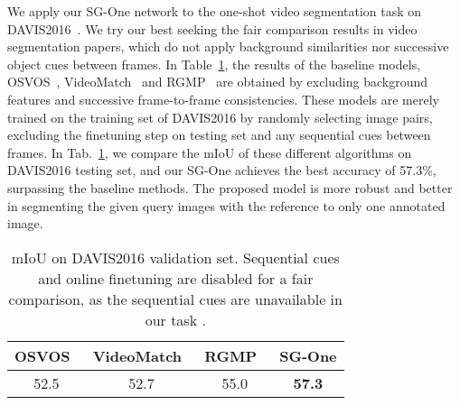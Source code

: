 \documentclass[journal]{IEEEtran}
\begin{document}
We apply our SG-One network to the one-shot video segmentation task on DAVIS2016~\cite{davis2016}.
We try our best seeking the fair comparison results in video segmentation papers, which do not apply background similarities nor successive object cues between frames.
In Table~\ref{davis_comp}, the results of the baseline models, OSVOS~\cite{caelles2017one}, VideoMatch~\cite{hu2018videomatch} and RGMP~\cite{oh2018fast} are obtained by excluding background features and successive frame-to-frame consistencies.
These models are merely trained on the training set of DAVIS2016 by randomly selecting image pairs, excluding the finetuning step on testing set and any sequential cues between frames.
In Tab.~\ref{davis_comp}, we compare the mIoU of these different algorithms on DAVIS2016 testing set, and our SG-One achieves the best accuracy of 57.3\%, surpassing the baseline methods.
The proposed model is more robust and better in segmenting the given query images with the reference to only one annotated image.

\begin{table}\setlength{\tabcolsep}{10pt}
  \centering
  \caption{mIoU on DAVIS2016 validation set. Sequential cues and online finetuning are disabled for a fair comparison, as the sequential cues are unavailable in our task .}\label{davis_comp}
  \begin{tabular}{c|c|c|c}
    \hline
    \hline
     \textbf{OSVOS}~\cite{caelles2017one} & \textbf{VideoMatch}~\cite{hu2018videomatch} & \textbf{RGMP}~\cite{oh2018fast} &  \textbf{SG-One} \\
    \hline
      52.5 & 52.7 & 55.0  & \textbf{57.3} \\
    \hline
    \hline
  \end{tabular}
  \vspace{-10pt}
\end{table}




\vspace{-10pt}
\end{document}
